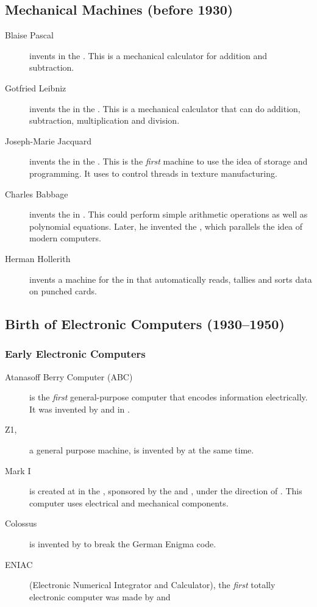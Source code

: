 \documentclass[../notes.tex]{subfiles}
\begin{document}
			\subsection{Mechanical Machines (before 1930)}
				\begin{description}
					\item[Blaise Pascal] invents  in the . This is a mechanical calculator for addition and subtraction.
					\item[Gotfried Leibniz] invents the  in the . This is a mechanical calculator that can do addition, subtraction, multiplication and division.
					\item[Joseph-Marie Jacquard] invents the  in the . This is the \emph{first} machine to use the idea of storage and programming. It uses  to control threads in texture manufacturing.
					\item[Charles Babbage] invents the  in . This could perform simple arithmetic operations as well as polynomial equations. Later, he invented the , which parallels the idea of modern computers.
					\item[Herman Hollerith] invents a machine for the  in  that automatically reads, tallies and sorts data on punched cards.
				\end{description}
			\subsection{Birth of Electronic Computers (1930--1950)}
				\subsubsection{Early Electronic Computers}
					\begin{description}
						\item[Atanasoff Berry Computer (ABC)] is the \emph{first} general-purpose computer that encodes information electrically. It was invented by  and  in .
						\item[Z1,] a general purpose machine, is invented by  at the same time.
						\item[Mark I] is created at  in the , sponsored by the  and , under the direction of . This computer uses electrical and mechanical components.
						\item[Colossus] is invented by  to break the German Enigma code.
						\item[ENIAC] (Electronic Numerical Integrator and Calculator), the \emph{first} totally electronic computer was made by  and  
					\end{description}
\end{document}
